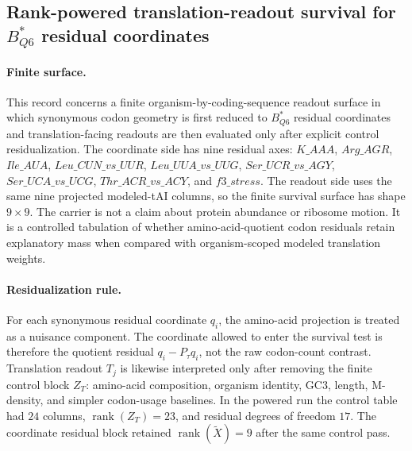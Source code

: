 \subsection{Rank-powered translation-readout survival for $B^\ast_{Q6}$ residual coordinates}
\label{sec:q6-rank-powered-translation-survival-cross-layer}

\paragraph{Finite surface.}
This record concerns a finite organism-by-coding-sequence readout surface in which synonymous codon geometry is first reduced to $B^\ast_{Q6}$ residual coordinates and translation-facing readouts are then evaluated only after explicit control residualization. The coordinate side has nine residual axes: $K\_AAA$, $Arg\_AGR$, $Ile\_AUA$, $Leu\_CUN\_vs\_UUR$, $Leu\_UUA\_vs\_UUG$, $Ser\_UCR\_vs\_AGY$, $Ser\_UCA\_vs\_UCG$, $Thr\_ACR\_vs\_ACY$, and $f3\_stress$. The readout side uses the same nine projected modeled-tAI columns, so the finite survival surface has shape $9 \times 9$. The carrier is not a claim about protein abundance or ribosome motion. It is a controlled tabulation of whether amino-acid-quotient codon residuals retain explanatory mass when compared with organism-scoped modeled translation weights.

\paragraph{Residualization rule.}
For each synonymous residual coordinate $q_i$, the amino-acid projection is treated as a nuisance component. The coordinate allowed to enter the survival test is therefore the quotient residual $q_i-P_\tau q_i$, not the raw codon-count contrast. Translation readout $T_j$ is likewise interpreted only after removing the finite control block $Z_T$: amino-acid composition, organism identity, GC3, length, M-density, and simpler codon-usage baselines. In the powered run the control table had $24$ columns, $\operatorname{rank}(Z_T)=23$, and residual degrees of freedom $17$. The coordinate residual block retained $\operatorname{rank}(\widetilde X)=9$ after the same control pass.

